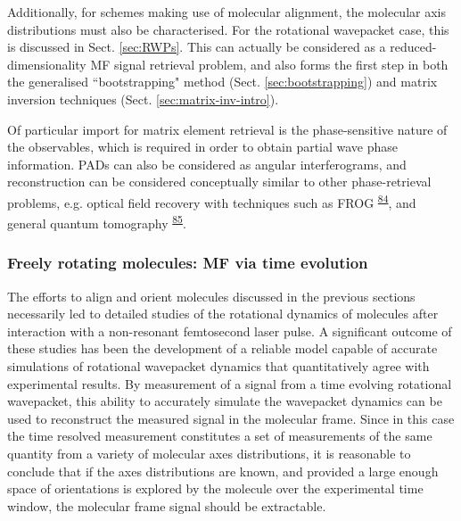\documentclass[10pt]{article}
\begin{document}
Additionally, for schemes making use of molecular alignment, the molecular axis distributions must also be characterised. For the rotational wavepacket case, this is discussed in Sect. \ref{sec:RWPs}. This can actually be considered as a reduced-dimensionality MF signal retrieval problem, and also forms the first step in both the generalised ``bootstrapping" method (Sect. \ref{sec:bootstrapping}) and matrix inversion techniques (Sect. \ref{sec:matrix-inv-intro}).

Of particular import for matrix element retrieval is the phase-sensitive nature of the observables, which is required in order to obtain partial wave phase information. PADs can also be considered as angular interferograms, and reconstruction can be considered conceptually similar to other phase-retrieval problems, e.g. optical field recovery with techniques such as FROG \textsuperscript{\hyperref[csl:84]{84}}, and general quantum tomography \textsuperscript{\hyperref[csl:85]{85}}. 



\subsubsection{Freely rotating molecules: MF via time evolution\label{sec:RWPs}}

The efforts to align and orient molecules discussed in the previous sections necessarily led to detailed studies of the rotational dynamics of molecules after interaction with a non-resonant femtosecond laser pulse. A significant outcome of these studies has been the development of a reliable model capable of accurate simulations of rotational wavepacket dynamics that quantitatively agree with experimental results. By measurement of a signal from a time evolving rotational wavepacket, this ability to accurately simulate the wavepacket dynamics can be used to reconstruct the measured signal in the molecular frame. Since in this case the time resolved measurement constitutes a set of measurements of the same quantity from a variety of molecular axes distributions, it is reasonable to conclude that if the axes distributions are known, and provided a large enough space of orientations is explored by the molecule over the experimental time window, the molecular frame signal should be extractable. 
\end{document}
